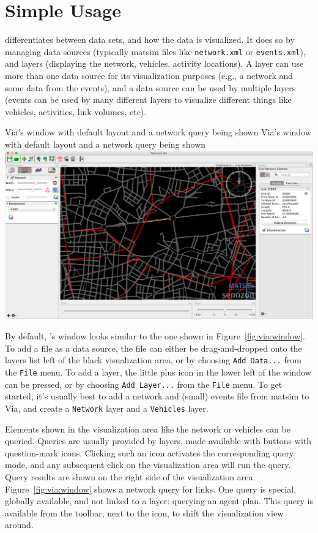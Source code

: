 \section{Simple Usage}
\Via{} differentiates between data sets, and how the data is visualized. It
does so by managing data sources (typically \gls{matsim} files like \lstinline|network.xml|
or \lstinline|events.xml|), and layers (\eg displaying the network, vehicles,
activity locations). A layer can use more than one data source for its
visualization purposes (e.g., a network and some data from the events), and a
data source can be used by multiple layers (\eg events can be used by many
different layers to visualize different things like vehicles, activities, link
volumes, etc).

\createfigure%
{Via's window with default layout and a network query being shown}%
{Via's window with default layout and a network query being shown}%
{\label{fig:via:window}}%
{\includegraphics[width=1.\textwidth,angle=0]{./extending/figures/via/window.png}}%
{}

By default, \Via{}'s window looks similar to the one shown in Figure~\ref{fig:via:window}.
To add a file as a data source, the file can either be drag-and-dropped onto the layers
list left of the black visualization area, or by choosing \lstinline|Add Data...|
from the \lstinline|File| menu. To add a layer, the little plus icon in the lower left of
the window can be pressed, or by choosing \lstinline|Add Layer...| from the \lstinline|File|
menu. To get started, it's usually best to add a network and (small) events
file from \gls{matsim} to Via, and create a \lstinline|Network| layer and a \lstinline|Vehicles| layer.

Elements shown in the visualization area like the network or vehicles can
be queried. Queries are usually provided by layers, made available with buttons
with question-mark icons. Clicking such an icon activates the corresponding
query mode, and any subsequent click on the visualization area will run the
query.
Query results are shown on the right side of the visualization area.
Figure~\ref{fig:via:window} shows a network query for links.
One query is special, globally available, and not linked to a
layer: querying an agent plan. This query is available from the toolbar, next to
the icon, to shift the visualization view around.


